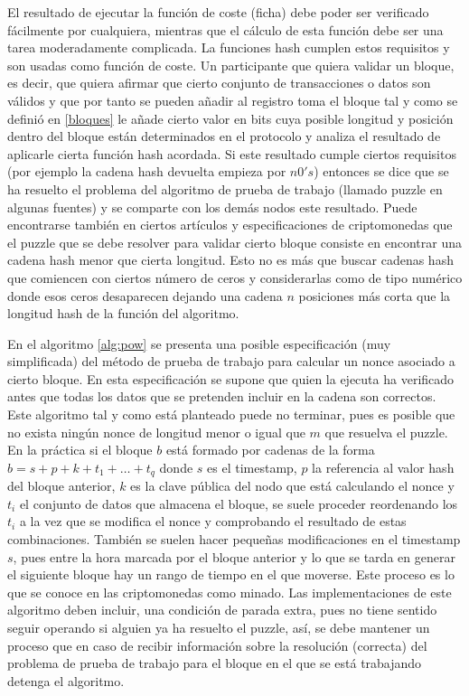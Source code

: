 El resultado de ejecutar la función de coste (ficha) debe poder ser verificado fácilmente por cualquiera, mientras que el cálculo de esta función debe ser una tarea moderadamente complicada. La funciones hash cumplen estos requisitos y son usadas como función de coste. Un participante que quiera validar un bloque, es decir, que quiera afirmar que cierto conjunto de transacciones o datos son válidos y que por tanto se pueden añadir al registro toma el bloque tal y como se definió en \ref{bloques} le añade cierto valor en bits cuya posible longitud y posición dentro del bloque están determinados en el protocolo y analiza el resultado de aplicarle cierta función hash acordada. Si este resultado cumple ciertos requisitos (por ejemplo la cadena hash devuelta empieza por $n 0's$) entonces se dice que se ha resuelto el problema del algoritmo de prueba de trabajo (llamado puzzle en algunas fuentes) y se comparte con los demás nodos este resultado. Puede encontrarse también en ciertos artículos y especificaciones de criptomonedas que el puzzle que se debe resolver para validar cierto bloque consiste en encontrar una cadena hash menor que cierta longitud. Esto no es más que buscar cadenas hash que comiencen con ciertos número de ceros y considerarlas como de tipo numérico donde esos ceros desaparecen dejando una cadena $n$ posiciones más corta que la longitud hash de la función del algoritmo. 

En el algoritmo \ref{alg:pow} se presenta una posible especificación (muy simplificada) del método de prueba de trabajo para calcular un nonce  asociado a cierto bloque. En esta especificación se supone que quien la ejecuta ha verificado antes que todas los datos que se pretenden incluir en la cadena son correctos. Este algoritmo tal y como está planteado puede no terminar, pues es posible que no exista ningún nonce de longitud menor o igual que $m$ que resuelva el puzzle. En la práctica si el bloque $b$ está formado por cadenas de la forma $b = s+p+k+t_{1}+ \ldots + t_{q}$ donde $s$ es el timestamp, $p$ la referencia al valor hash del bloque anterior, $k$ es la clave pública del nodo que está calculando el nonce y $t_{i}$ el conjunto de datos que almacena el bloque, se suele proceder reordenando los $t_{i}$ a la vez que se modifica el nonce y comprobando el resultado de estas combinaciones. También se suelen hacer pequeñas modificaciones en el timestamp $s$, pues entre la hora marcada por el bloque anterior y lo que se tarda en generar el siguiente bloque hay un rango de tiempo en el que moverse. Este proceso es lo que se conoce en las criptomonedas como minado. Las implementaciones de este algoritmo deben incluir, una condición de parada extra, pues no tiene sentido seguir operando si alguien ya ha resuelto el puzzle, así, se debe mantener un proceso que en caso de recibir información sobre la resolución (correcta) del problema de prueba de trabajo para el bloque en el que se está trabajando detenga el algoritmo. 

